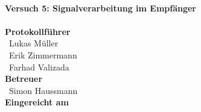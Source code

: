 \documentclass[a4paper, 11pt, oneside]{Thesis}  %
\begin{document}
\begin{titlepage}
\HRule \\[0.4cm]
{ \huge \bfseries Versuch 5: Signalverarbeitung im Empfänger}\\[0.4cm] %
\HRule \\[1.5cm]
 
\textbf{Protokollführer}\\
{\large\ Lukas Müller}\\[0.2cm]
{\large\ Erik Zimmermann}\\[0.2cm]
{\large\ Farhad Valizada}\\[0.7cm]

\textbf{Betreuer}\\
{\large\ Simon Haussmann}\\[0.2cm]




\textbf{Eingereicht am}\\


 

\vfill %

\end{titlepage}


\clearpage  %

\clearpage

\pagestyle{fancy}
\fancyhf{}
\fancyfoot[C]{\thepage} %
\renewcommand{\headrulewidth}{0pt}

\let\oldchapter\chapter
\renewcommand{\chapter}{\clearpage\pagestyle{fancy}\oldchapter}
\end{document}
